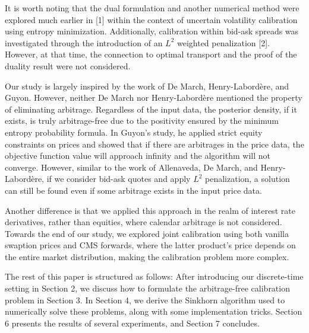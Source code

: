 It is worth noting that the dual formulation and another numerical method were explored much earlier in [1] 
within the context of uncertain volatility calibration using entropy minimization. Additionally, calibration within 
bid-ask spreads was investigated through the introduction of an \(L^{2}\) weighted penalization [2]. 
However, at that time, the connection to optimal transport and the proof of the duality result were not considered.

\vspace{.1in}
Our study is largely inspired by the work of De March, Henry-Labordère, and Guyon. However, neither De March nor 
Henry-Labordère mentioned the property of eliminating arbitrage. Regardless of the input data, the posterior density, 
if it exists, is truly arbitrage-free due to the positivity ensured by the minimum entropy probability formula. In Guyon's 
study, he applied strict equity constraints on prices and showed that if there are arbitrages in the price data, 
the objective function value will approach infinity and the algorithm will not converge. However, similar to the work of 
Allenaveda, De March, and Henry-Labordère, if we consider bid-ask quotes and apply \(L^{2}\) penalization, 
a solution can still be found even if some arbitrage exists in the input price data.

Another difference is that we applied this approach in the realm of interest rate derivatives, rather than equities, 
where calendar arbitrage is not considered. Towards the end of our study, we explored joint calibration using both vanilla 
swaption prices and CMS forwards, where the latter product's price depends on the entire market distribution, making the 
calibration problem more complex.

The rest of this paper is structured as follows: After introducing our discrete-time setting in Section 2, 
we discuss how to formulate the arbitrage-free calibration problem in Section 3. In Section 4, we derive 
the Sinkhorn algorithm used to numerically solve these problems, along with some implementation tricks. 
Section 6 presents the results of several experiments, and Section 7 concludes.


